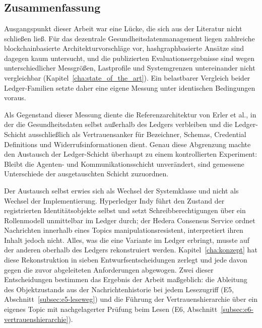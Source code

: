 \chapter{}
\label{sec:conclusion}

\section{Zusammenfassung}
\label{sec:conclusion-zusammenfassung}

Ausgangspunkt dieser Arbeit war eine Lücke, die sich aus der Literatur nicht schließen ließ. Für das dezentrale Gesundheitsdatenmanagement liegen zahlreiche blockchainbasierte Architekturvorschläge vor, hashgraphbasierte Ansätze sind dagegen kaum untersucht, und die publizierten Evaluationsergebnisse sind wegen unterschiedlicher Messgrößen, Lastprofile und Systemgrenzen untereinander nicht vergleichbar (Kapitel~\ref{cha:state_of_the_art}). Ein belastbarer Vergleich beider Ledger-Familien setzte daher eine eigene Messung unter identischen Bedingungen voraus.

Als Gegenstand dieser Messung diente die Referenzarchitektur von Erler et al., in der die Gesundheitsdaten selbst außerhalb des Ledgers verbleiben und die Ledger-Schicht ausschließlich als Vertrauensanker für Bezeichner, Schemas, Credential Definitions und Widerrufsinformationen dient. Genau diese Abgrenzung machte den Austausch der Ledger-Schicht überhaupt zu einem kontrollierten Experiment: Bleibt die Agenten- und Kommunikationsschicht unverändert, sind gemessene Unterschiede der ausgetauschten Schicht zuzuordnen.

Der Austausch selbst erwies sich als Wechsel der Systemklasse und nicht als Wechsel der Implementierung. Hyperledger Indy führt den Zustand der registrierten Identitätsobjekte selbst und setzt Schreibberechtigungen über ein Rollenmodell unmittelbar im Ledger durch; der Hedera Consensus Service ordnet Nachrichten innerhalb eines Topics manipulationsresistent, interpretiert ihren Inhalt jedoch nicht. Alles, was die eine Variante im Ledger erbringt, musste auf der anderen oberhalb des Ledgers rekonstruiert werden. Kapitel~\ref{cha:konzept} hat diese Rekonstruktion in sieben Entwurfsentscheidungen zerlegt und jede davon gegen die zuvor abgeleiteten Anforderungen abgewogen. Zwei dieser Entscheidungen bestimmen das Ergebnis der Arbeit maßgeblich: die Ableitung des Objektzustands aus der Nachrichtenhistorie bei jedem Lesezugriff (E5, Abschnitt~\ref{subsec:e5-leseweg}) und die Führung der Vertrauenshierarchie über ein eigenes Topic mit nachgelagerter Prüfung beim Lesen (E6, Abschnitt~\ref{subsec:e6-vertrauenshierarchie}).

